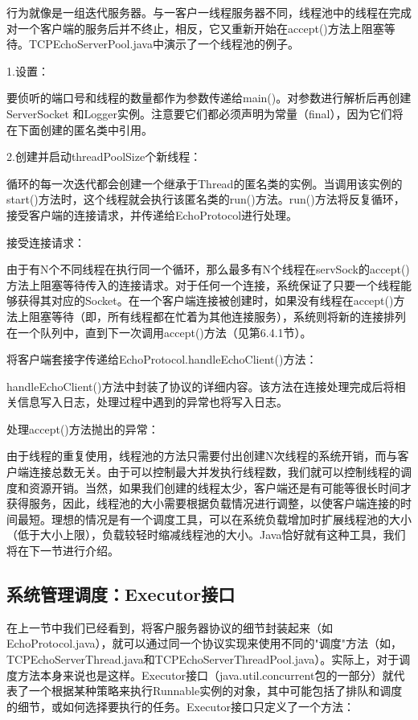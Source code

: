 		行为就像是一组迭代服务器。与一客户一线程服务器不同，线程池中的线程在完成对一个客户端的服务后并不终止，相反，它又重新开始在accept()方法上阻塞等待。TCPEchoServerPool.java中演示了一个线程池的例子。 

		

		1.设置：

		要侦听的端口号和线程的数量都作为参数传递给main()。对参数进行解析后再创建ServerSocket 和Logger实例。注意要它们都必须声明为常量（final），因为它们将在下面创建的匿名类中引用。 

		2.创建并启动threadPoolSize个新线程：

		循环的每一次迭代都会创建一个继承于Thread的匿名类的实例。当调用该实例的start()方法时，这个线程就会执行该匿名类的run()方法。run()方法将反复循环，接受客户端的连接请求，并传递给EchoProtocol进行处理。 

		接受连接请求：

		由于有N个不同线程在执行同一个循环，那么最多有N个线程在servSock的accept()方法上阻塞等待传入的连接请求。对于任何一个连接，系统保证了只要一个线程能够获得其对应的Socket。在一个客户端连接被创建时，如果没有线程在accept()方法上阻塞等待（即，所有线程都在忙着为其他连接服务），系统则将新的连接排列在一个队列中，直到下一次调用accept()方法（见第6.4.1节）。 

		将客户端套接字传递给EchoProtocol.handleEchoClient()方法：

		handleEchoClient()方法中封装了协议的详细内容。该方法在连接处理完成后将相关信息写入日志，处理过程中遇到的异常也将写入日志。 

		处理accept()方法抛出的异常：

		由于线程的重复使用，线程池的方法只需要付出创建N次线程的系统开销，而与客户端连接总数无关。由于可以控制最大并发执行线程数，我们就可以控制线程的调度和资源开销。当然，如果我们创建的线程太少，客户端还是有可能等很长时间才获得服务，因此，线程池的大小需要根据负载情况进行调整，以使客户端连接的时间最短。理想的情况是有一个调度工具，可以在系统负载增加时扩展线程池的大小（低于大小上限），负载较轻时缩减线程池的大小。Java恰好就有这种工具，我们将在下一节进行介绍。 

	\subsection{系统管理调度：Executor接口}

		在上一节中我们已经看到，将客户服务器协议的细节封装起来（如EchoProtocol.java），就可以通过同一个协议实现来使用不同的"调度"方法（如，TCPEchoServerThread.java和TCPEchoServerThreadPool.java）。实际上，对于调度方法本身来说也是这样。Executor接口（java.util.concurrent包的一部分）就代表了一个根据某种策略来执行Runnable实例的对象，其中可能包括了排队和调度的细节，或如何选择要执行的任务。Executor接口只定义了一个方法： 

